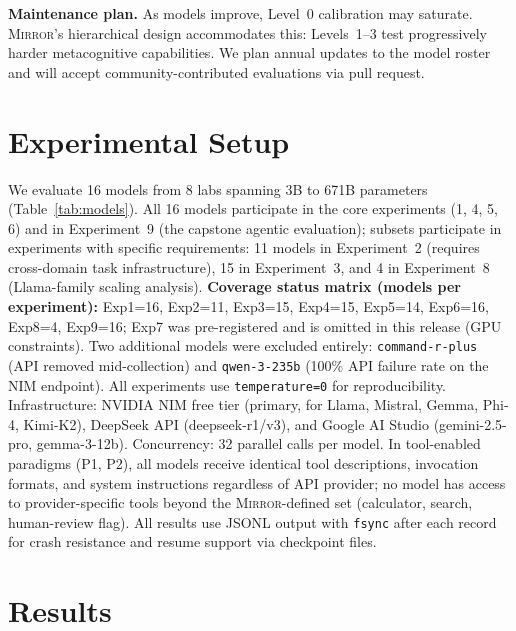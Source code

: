 \documentclass[10pt]{article}
\newcommand{\mirror}{\textsc{Mirror}}
\begin{document}
\textbf{Maintenance plan.} As models improve, Level~0 calibration may saturate.
\mirror{}'s hierarchical design accommodates this: Levels~1--3 test progressively
harder metacognitive capabilities. We plan annual updates to the model roster and
will accept community-contributed evaluations via pull request.

\section{Experimental Setup}
\label{sec:setup}



We evaluate 16 models from 8 labs spanning 3B to 671B parameters
(Table~\ref{tab:models}). All 16 models participate in the core experiments (1, 4, 5, 6) and in Experiment~9 (the capstone agentic evaluation); subsets participate in experiments with specific requirements: 11 models in Experiment~2 (requires cross-domain task infrastructure), 15 in Experiment~3, and 4 in Experiment~8 (Llama-family scaling analysis).
\textbf{Coverage status matrix (models per experiment):} Exp1=16, Exp2=11, Exp3=15, Exp4=15, Exp5=14, Exp6=16, Exp8=4, Exp9=16; Exp7 was pre-registered and is omitted in this release (GPU constraints).
Two additional models were excluded entirely:
\texttt{command-r-plus} (API removed mid-collection) and \texttt{qwen-3-235b}
(100\% API failure rate on the NIM endpoint). All experiments use
\texttt{temperature=0} for reproducibility. Infrastructure: NVIDIA NIM free tier
(primary, for Llama, Mistral, Gemma, Phi-4, Kimi-K2), DeepSeek API
(deepseek-r1/v3), and Google AI Studio (gemini-2.5-pro, gemma-3-12b).
Concurrency: 32 parallel calls per model.
In tool-enabled paradigms (P1, P2), all models receive identical tool descriptions,
invocation formats, and system instructions regardless of API provider; no model
has access to provider-specific tools beyond the \mirror{}-defined set
(calculator, search, human-review flag). All results use JSONL output with
\texttt{fsync} after each record for crash resistance and resume support via
checkpoint files.

\section{Results}
\label{sec:results}
\end{document}
